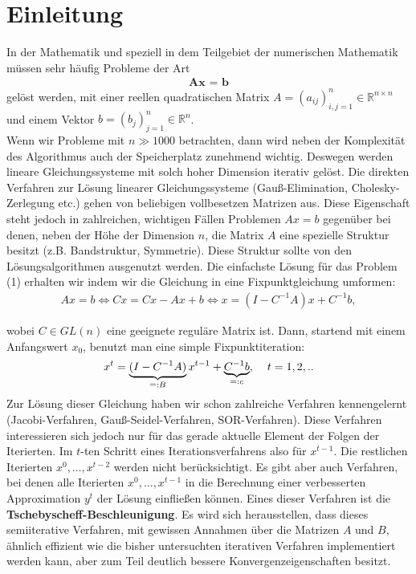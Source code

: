 \documentclass[12pt,a4paper,numbers=endperiod]{scrartcl}
\theoremstyle{definition}
\def\RR{{\mathbb R}}
\begin{document}
\begin{center}
	{\large \text{\today}}
\end{center}


\newpage
\vspace{0.125\baselineskip}
\tableofcontents %
\newpage
\onehalfspacing
\section{Einleitung}

In der Mathematik und speziell in dem Teilgebiet der numerischen Mathematik müssen sehr häufig Probleme der Art
\begin{gather}
	 \textbf{Ax = b}
\end{gather}
gelöst werden, mit einer reellen quadratischen Matrix $A = (a_{ij})_{i,j = 1}^n \in \RR^{n \times n}$ und einem Vektor $b = (b_j)_{j = 1}^n \in \RR^n$.\\ Wenn wir Probleme mit $n \gg
 1000$ betrachten, dann wird neben der Komplexität des Algorithmus auch der Speicherplatz zunehmend wichtig. Deswegen werden lineare Gleichungssysteme mit solch hoher Dimension iterativ gelöst. Die direkten Verfahren zur Lösung linearer Gleichungssysteme (Gauß-Elimination, Cholesky-Zerlegung etc.) gehen von beliebigen vollbesetzen Matrizen aus. Diese Eigenschaft steht jedoch in zahlreichen, wichtigen Fällen Problemen $Ax = b$ gegenüber bei denen, neben der Höhe der Dimension $n$, die Matrix $A$ eine spezielle Struktur besitzt (z.B. Bandstruktur, Symmetrie). Diese Struktur sollte von den Lösungsalgorithmen ausgenutzt werden. Die einfachste Lösung für das Problem (1) erhalten wir indem wir die Gleichung in eine Fixpunktgleichung umformen: 
\begin{align}
	Ax = b \Leftrightarrow Cx = Cx - Ax + b \Leftrightarrow x = (I - C^{-1}A)x + C^{-1}b,
\end{align}

wobei $C \in GL(n)$ eine geeignete reguläre Matrix ist.
Dann, startend mit einem Anfangswert $x_0$, benutzt man eine simple Fixpunktiteration: 
\begin{gather}
	x^t = \underbrace{(I-C^{-1}A)}_{=:B}x^{t-1} + \underbrace{C^{-1}b}_{=:c}, \hspace{4mm} t = 1,2,..
\end{gather}
Zur Lösung dieser Gleichung haben wir schon zahlreiche Verfahren kennengelernt (Jacobi-Verfahren, Gauß-Seidel-Verfahren, SOR-Verfahren). Diese Verfahren interessieren sich jedoch nur für das gerade aktuelle Element der Folgen der Iterierten. Im $t$-ten Schritt eines Iterationsverfahrens also für $x^{t-1}$. Die restlichen Iterierten $x^0, \ldots, x^{t-2}$ werden nicht berücksichtigt. Es gibt aber auch Verfahren, bei denen alle Iterierten $x^0, \ldots, x^{t-1}$ in die Berechnung einer verbesserten Approximation $y^t$ der Lösung einfließen können. Eines dieser Verfahren ist die \textbf{Tschebyscheff-Beschleunigung}. Es wird sich herausstellen, dass dieses semiiterative Verfahren, mit gewissen Annahmen über die Matrizen $A$ und $B$, ähnlich effizient wie die bisher untersuchten iterativen Verfahren implementiert werden kann, aber zum Teil deutlich bessere Konvergenzeigenschaften besitzt. 
\end{document}
